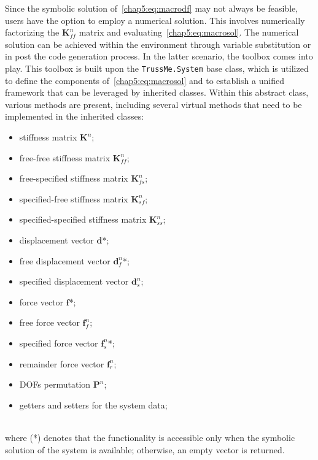 Since the symbolic solution of~\eqref{chap5:eq:macrodf} may not always be feasible, users have the option to employ a numerical solution. This involves numerically factorizing the $\mathbf{K}^{n}_{ff}$ matrix and evaluating~\eqref{chap5:eq:macrosol}. The numerical solution can be achieved within the \Maple{} environment through variable substitution or in \Matlab{} post the code generation process. In the latter scenario, the \TrussMe{} \Matlab{} toolbox comes into play. This toolbox is built upon the \texttt{TrussMe.System} base class, which is utilized to define the components of~\eqref{chap5:eq:macrosol} and to establish a unified framework that can be leveraged by inherited classes. Within this abstract class, various methods are present, including several virtual methods that need to be implemented in the inherited classes: \\[0.5em]
%
\begin{minipage}[t]{0.49\textwidth}
  \begin{itemize}
  \setlength{\itemsep}{-0.25em}
  \item stiffness matrix $\mathbf{K}^{n}$;
  \item free-free stiffness matrix $\mathbf{K}^{n}_{ff}$;
  \item free-specified stiffness matrix $\mathbf{K}^{n}_{fs}$;
  \item specified-free stiffness matrix $\mathbf{K}^{n}_{sf}$;
  \item specified-specified stiffness matrix $\mathbf{K}^{n}_{ss}$;
  \item displacement vector $\mathbf{d}$*;
  \item free displacement vector $\mathbf{d}^{n}_{f}$*;
  \end{itemize}
\end{minipage}
\hfill
\begin{minipage}[t]{0.49\textwidth}
  \begin{itemize}
  \setlength{\itemsep}{-0.25em}
  \item specified displacement vector $\mathbf{d}^{n}_{s}$;
  \item force vector $\mathbf{f}$*;
  \item free force vector $\mathbf{f}^{n}_{f}$;
  \item specified force vector $\mathbf{f}^{n}_{s}$*;
  \item remainder force vector $\mathbf{f}^{n}_{r}$;
  \item \acp{DOF} permutation $\mathbf{P}^{n}$;
  \item getters and setters for the system data;
  \end{itemize}
\end{minipage} \\[0.5em]
%
where (*) denotes that the functionality is accessible only when the symbolic solution of the system is available; otherwise, an empty vector is returned.

